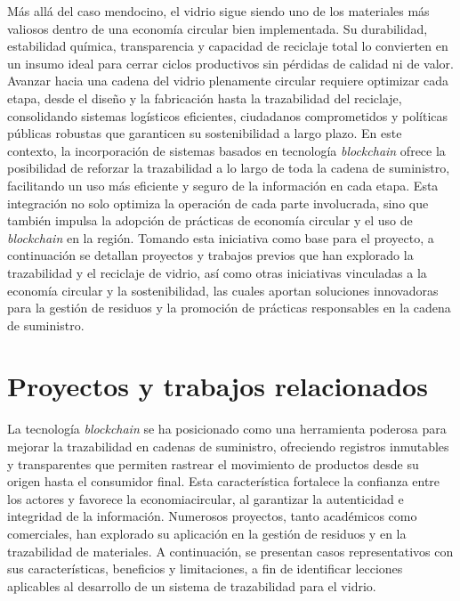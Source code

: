Más allá del caso mendocino, el vidrio sigue siendo uno de los materiales más valiosos dentro de una economía circular bien implementada. Su durabilidad, estabilidad química, transparencia y capacidad de reciclaje total lo convierten en un insumo ideal para cerrar ciclos productivos sin pérdidas de calidad ni de valor. Avanzar hacia una cadena del vidrio plenamente circular requiere optimizar cada etapa, desde el diseño y la fabricación hasta la trazabilidad del reciclaje, consolidando sistemas logísticos eficientes, ciudadanos comprometidos y políticas públicas robustas que garanticen su \gls{sostenibilidad} a largo plazo. En este contexto, la incorporación de sistemas basados en tecnología \textit{blockchain} ofrece la posibilidad de reforzar la trazabilidad a lo largo de toda la cadena de suministro, facilitando un uso más eficiente y seguro de la información en cada etapa. Esta integración no solo optimiza la operación de cada parte involucrada, sino que también impulsa la adopción de prácticas de economía circular y el uso de \textit{blockchain} en la región. Tomando esta iniciativa como base para el proyecto, a continuación se detallan proyectos y trabajos previos que han explorado la trazabilidad y el reciclaje de vidrio, así como otras iniciativas vinculadas a la economía circular y la sostenibilidad, las cuales aportan soluciones innovadoras para la gestión de residuos y la promoción de prácticas responsables en la cadena de suministro.

\section{Proyectos y trabajos relacionados}
\label{sec:related-work}

La tecnología \textit{blockchain} se ha posicionado como una herramienta poderosa para mejorar la \gls{trazabilidad} en cadenas de suministro, ofreciendo registros inmutables y transparentes que permiten rastrear el movimiento de productos desde su origen hasta el consumidor final. Esta característica fortalece la confianza entre los actores y favorece la \gls{economiacircular}, al garantizar la autenticidad e integridad de la información. Numerosos proyectos, tanto académicos como comerciales, han explorado su aplicación en la gestión de residuos y en la trazabilidad de materiales. A continuación, se presentan casos representativos con sus características, beneficios y limitaciones, a fin de identificar lecciones aplicables al desarrollo de un sistema de trazabilidad para el vidrio.


